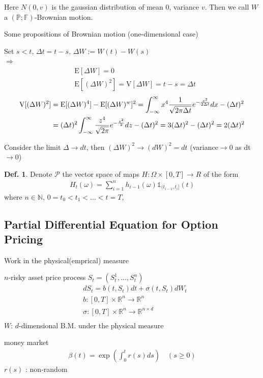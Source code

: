 \documentclass[a4paper,11pt]{jsarticle}
\theoremstyle{definition}
\newtheorem{definition}{Def.}[subsection]
\newcommand{\df}[2]{\dfrac{#1}{#2}}
\newcommand{\intinf}{\int_{-\infty}^{\infty}}
\begin{document}
Here $N(0,v)$ is the gaussian distribution of mean $0$,
variance $v$.
Then we call $W$ a $(\mathbb{P};\mathbb{F})$-Brownian motion.

Some propositions of Brownian motion (one-dimensional case)

Set $s<t, \, \Delta t=t-s, \, \Delta W:=W(t)-W(s)$ \\
$\Rightarrow$
\begin{align}
  &\mathrm{E}[\Delta W]=0 \\
  &\mathrm{E}[(\Delta W)^2]=\mathrm{V}[\Delta W]=t-s=\Delta t
\end{align}
\begin{align}
  \mathrm{V}[(\Delta W)^2]
  &=\mathrm{E}[(\Delta W)^4]-\mathrm{E}[(\Delta W)^w]^2
  =\intinf x^4 \df{1}{\sqrt{2\pi\Delta t}}
  e^{-\frac{x^2}{2\Delta t}}dx - (\Delta t)^2 \notag \\
  &=(\Delta t)^2 \intinf \df{z^4}{\sqrt{2\pi}}
  e^{-\frac{z^2}{2}}dz - (\Delta t)^2 
  =3(\Delta t)^2 - (\Delta t)^2 = 2(\Delta t)^2
\end{align}

Consider the limit $\Delta \to dt$,
then $(\Delta W)^2 \to (dW)^2=dt$ (variance$\to 0$ as dt$\to 0$)

\begin{definition}
  Denote $\mathcal{P}$ the vector space of maps
  $H:\Omega\times[0,T]\to R$ of the form
  \begin{align}
    H_t(\omega)=\sum_{i=1}^n h_{i-1}(\omega)
    \mathbb{1}_{(t_{i-1},t_i]} (t)
  \end{align}
  where $n\in \mathbb{N}, \, 0=t_0<t_1<...<t=T$,
\end{definition}

\subsection{Partial Differential Equation for Option Pricing}
Work in the physical(emprical) measure

$n$-risky asset price process $S_t=(S_t^1,...,S_t^n)$
\begin{align}
  &dS_t=b(t,S_t)dt+\sigma(t,S_t)dW_t \\
  &b:[0,T]\times\mathbb{R}^n \to \mathbb{R}^n \\
  &\sigma:[0,T]\times\mathbb{R}^n \to \mathbb{R}^{n\times d}\\
\end{align}
$W$: $d$-dimensional B.M. under the physical measure

money market
\begin{align}
  \beta(t) = \exp\left(\int_0^t r(s)ds \right)
  \quad (s\geq 0)
\end{align}
$r(s)$ : non-random
\end{document}
